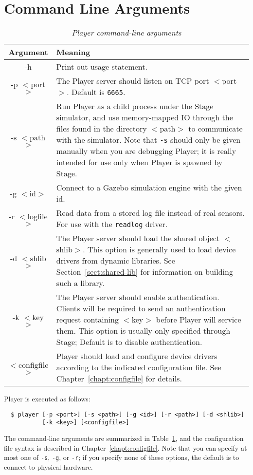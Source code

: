 \documentclass[11pt]{report}
\def\DEFAULTPORT {6665}
\begin{document}
\section{Command Line Arguments}
\label{sect:commandline}
\begin{table}[ht]
\begin{center}
{\normalsize
\begin{tabularx}{\columnwidth}{|c|X|}
\hline
Argument & Meaning  \\
\hline
-h & Print out usage statement.\\
\hline
-p $<$port$>$ & The Player server should listen on TCP port $<$port$>$.  Default
is {\tt \DEFAULTPORT}. \\
\hline
-s $<$path$>$ & Run Player as a child process under the Stage simulator,
and use memory-mapped IO through the files found in the directory
$<$path$>$ to communicate with the simulator.  Note that \verb+-s+
should only be given manually when you are debugging Player; it is really
intended for use only when Player is spawned by Stage.\\
\hline
-g $<$id$>$ & Connect to a Gazebo simulation engine with the given id.\\
\hline
-r $<$logfile$>$ & Read data from a stored log file instead of real
sensors.  For use with the {\tt readlog} driver. \\
\hline
-d $<$shlib$>$ & The Player server should load the shared object $<$shlib$>$.
This option is generally used to load device drivers from dynamic libraries.
See Section~\ref{sect:shared-lib} for information on building such a library.\\
\hline
-k $<$key$>$ & The Player server should enable authentication.  Clients will
be required to send an authentication request containing $<$key$>$ before Player
will service them.  This option is usually only specified through Stage;
Default is to disable authentication.\\
\hline
$<$configfile$>$ & Player should load and configure device drivers according to
the indicated configuration file.  See Chapter~\ref{chapt:configfile} for
details.\\
\hline
\end{tabularx}
}
\end{center}
\caption{{\em Player command-line arguments}}
\label{table:commandlinefig}
\end{table}

Player is executed as follows:
\begin{verbatim}
  $ player [-p <port>] [-s <path>] [-g <id>] [-r <path>] [-d <shlib>] 
           [-k <key>] [<configfile>]
\end{verbatim}  %
The command-line arguments are summarized in
Table~\ref{table:commandlinefig}, and the configuration file syntax is
described in Chapter~\ref{chapt:configfile}.  Note that you can specify
at most one of {\tt -s}, {\tt -g}, or {\tt -r}; if you specify none of
these options, the default is to connect to physical hardware.
\end{document}
